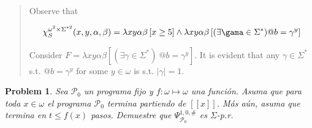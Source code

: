 \documentclass[a4paper, 12pt]{article}
\newtheorem{problem}{Problem}
\newtheorem{problem}{Problem}
\begin{document}
\small
\begin{quote}

Observe that 

\begin{align*}
    \chi_S^{\omega^{2} \times \Sigma^{*2} }(x, y, \alpha, \beta) = \lambda
    xy\alpha\beta \left[ x \geq 5  \right] \land \lambda xy \alpha\beta \left[
    (\exists \gama \in \Sigma^{*}) @b = \gamma^y\right]
\end{align*}

Consider $F = \lambda xy\alpha\beta \left[  (\exists \gamma \in \Sigma^{*}) ~ @b
= \gamma^y \right]$. It is evident that any $\gamma \in \Sigma^{*}$ s.t. $@b =
\gamma^y$ for some $y \in \omega$ is s.t. $|\gamma| = 1$.

\end{quote}
\normalsize

\pagebreak 

\begin{problem}
    Sea $\mathcal{P}_0$ un programa fijo y $f : \omega \mapsto \omega$ una
    función. Asuma que para toda $x \in \omega$ el programa $\mathcal{P}_0$
    termina partiendo de $[\![ x ]\!]$. Más aún, asuma que termina en $t \leq
    f(x)$ pasos. Demuestre que $\Psi_{\mathcal{P}_0}^{1, 0, \#}$ es $\Sigma$-p.r. 
\end{problem}
\end{document}

